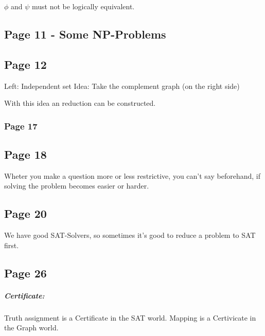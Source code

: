 \documentclass[a4paper]{article}
\begin{document}
$\phi $ and $\psi$ must not be logically equivalent.

\subsection{Page 11 - Some NP-Problems}

\subsection{Page 12}
Left: Independent set
Idea: Take the complement graph (on the right side)

With this idea an reduction can be constructed.

\subsubsection{Page 17}


 \begin{center}
\end{center} 

\subsection{Page 18}
Wheter you make a question more or less restrictive, you can't say beforehand,
if solving the problem becomes easier or harder. 

\subsection{Page 20}
We have good SAT-Solvers, so sometimes it's good to reduce a problem to SAT
first.

\subsection{Page 26}
\subparagraph{Certificate:} Truth assignment is a Certificate in the SAT world.
Mapping is a Certivicate in the Graph world.
\end{document}
